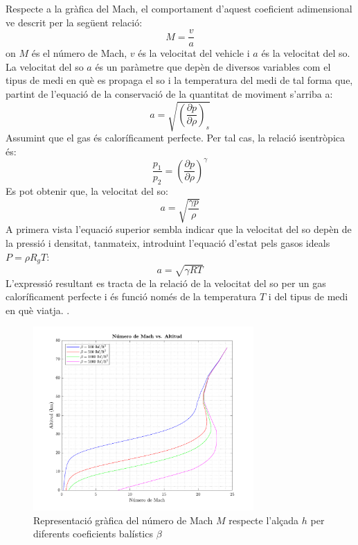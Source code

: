Respecte a la gràfica del Mach, el comportament d'aquest coeficient adimensional ve descrit per la següent relació:
\begin{equation} \label{eq:mach_definition}
    M = \frac{v}{a}
\end{equation}
on $M$ és el número de Mach, $v$ és la velocitat del vehicle i $a$ és la velocitat del so.
La velocitat del so $a$ és un paràmetre que depèn de diversos variables com el tipus de medi en què es propaga el so i la temperatura del medi de tal forma que, partint de l'equació de la conservació de la quantitat de moviment s'arriba a:
\begin{equation*}
    a = \sqrt{\left( \frac{\partial p}{\partial \rho}\right)_s}
\end{equation*}
Assumint que el gas és caloríficament perfecte. Per tal cas, la relació isentròpica és:
\begin{equation*}
    \frac{p_1}{p_2} = \left(\frac{\partial p}{\partial \rho}\right)^\gamma
\end{equation*}
Es pot obtenir que, la velocitat del so:
\begin{equation*}
    a = \sqrt{\frac{\gamma p}{\rho}}
\end{equation*}
A primera vista l'equació superior sembla indicar que la velocitat del so depèn de la pressió i densitat, tanmateix, introduint l'equació d'estat pels gasos ideals $P=\rho R_g T$:
\begin{equation}
    a = \sqrt{\gamma R T}
\end{equation}
L'expressió resultant es tracta de la relació de la velocitat del so per un gas caloríficament perfecte i és funció només de la temperatura $T$ i del tipus de medi en què viatja.
\cite{anderson}.

\begin{figure}[ht]
    \centering
    \includegraphics[width=0.75\textwidth]{imagenes/01_ballistic_graficas/mach.pdf}
    \caption{Representació gràfica del número de Mach $M$ respecte l'alçada $h$ per diferents coeficients balístics $\beta$}
    \label{fig:mach}
\end{figure}

